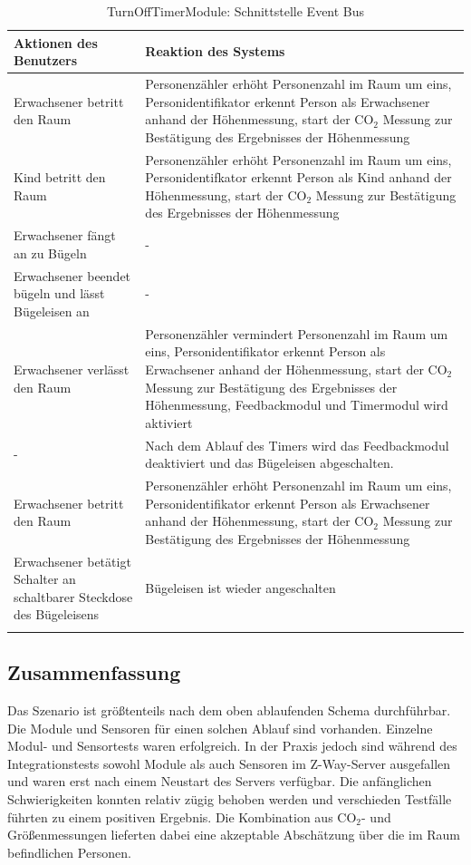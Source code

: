 \begin{longtabu} to 
	\hline
	\textbf{Aktionen des Benutzers}									& \textbf{Reaktion des Systems} \\
	\hline
	\endhead
	Erwachsener betritt den Raum	& Personenzähler erhöht Personenzahl im Raum um eins, Personidentifikator erkennt Person als Erwachsener anhand der Höhenmessung, start der CO$_2$ Messung zur Bestätigung des Ergebnisses der Höhenmessung \\
	\hline
	Kind betritt den Raum	& Personenzähler erhöht Personenzahl im Raum um eins, Personidentifkator erkennt Person als Kind anhand der Höhenmessung, start der CO$_2$ Messung zur Bestätigung des Ergebnisses der Höhenmessung \\
	\hline
	Erwachsener fängt an zu Bügeln	& - \\
	\hline
	Erwachsener beendet bügeln und lässt Bügeleisen an	& - \\
	\hline
	Erwachsener verlässt den Raum	& Personenzähler vermindert Personenzahl im Raum um eins, Personidentifikator erkennt Person als Erwachsener anhand der Höhenmessung, start der CO$_2$ Messung zur Bestätigung des Ergebnisses der Höhenmessung, Feedbackmodul und Timermodul wird aktiviert \\
	\hline
	-	& Nach dem Ablauf des Timers wird das Feedbackmodul deaktiviert und das Bügeleisen abgeschalten. \\
	\hline
	Erwachsener betritt den Raum	& Personenzähler erhöht Personenzahl im Raum um eins, Personidentifikator erkennt Person als Erwachsener anhand der Höhenmessung, start der CO$_2$ Messung zur Bestätigung des Ergebnisses der Höhenmessung \\
	\hline
	Erwachsener betätigt Schalter an schaltbarer Steckdose des Bügeleisens 	& Bügeleisen ist wieder angeschalten \\
	\hline
	\caption{TurnOffTimerModule: Schnittstelle Event Bus}
\end{longtabu}

\subsection{Zusammenfassung}
Das Szenario ist größtenteils nach dem oben ablaufenden Schema durchführbar. Die Module und Sensoren für einen solchen Ablauf sind vorhanden. Einzelne Modul- und Sensortests waren erfolgreich. In der Praxis jedoch sind während des Integrationstests sowohl Module als auch Sensoren im Z-Way-Server ausgefallen und waren erst nach einem Neustart des Servers verfügbar. Die anfänglichen Schwierigkeiten konnten relativ zügig behoben werden und verschieden Testfälle führten zu einem positiven Ergebnis. Die Kombination aus CO$_2$- und Größenmessungen lieferten dabei eine akzeptable Abschätzung über die im Raum befindlichen Personen.




